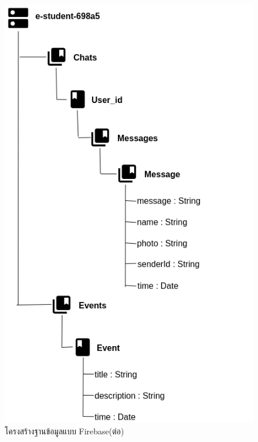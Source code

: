 	\begin{figure}[H]
	\centering
	\includegraphics[width=0.9\columnwidth]
	{Figures/3/DB/DB2}
	\caption{โครงสร้างฐานข้อมูลแบบ Firebase(ต่อ)}
	\label{Fig:DB2}
\end{figure}
